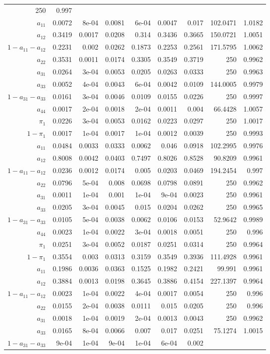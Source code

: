 \documentclass[]{article}
\begin{document}
\begin{longtable}[]{@{}rrrrrrrrr@{}}
250 & 0.997\tabularnewline
\(a_{11}\) & 0.0072 & 8e-04 & 0.0081 & 6e-04 & 0.0047 & 0.017 & 102.0471
& 1.0182\tabularnewline
\(a_{12}\) & 0.3419 & 0.0017 & 0.0208 & 0.314 & 0.3436 & 0.3665 &
150.0721 & 1.0051\tabularnewline
\(1 - a_{11} - a_{12}\) & 0.2231 & 0.002 & 0.0262 & 0.1873 & 0.2253 &
0.2561 & 171.5795 & 1.0062\tabularnewline
\(a_{22}\) & 0.3531 & 0.0011 & 0.0174 & 0.3305 & 0.3549 & 0.3719 & 250 &
0.9962\tabularnewline
\(a_{31}\) & 0.0264 & 3e-04 & 0.0053 & 0.0205 & 0.0263 & 0.0333 & 250 &
0.9963\tabularnewline
\(a_{33}\) & 0.0052 & 4e-04 & 0.0043 & 6e-04 & 0.0042 & 0.0109 &
144.0005 & 0.9979\tabularnewline
\(1 - a_{31} - a_{33}\) & 0.0161 & 3e-04 & 0.0046 & 0.0109 & 0.0155 &
0.0226 & 250 & 0.9997\tabularnewline
\(a_{44}\) & 0.0017 & 2e-04 & 0.0018 & 2e-04 & 0.0011 & 0.004 & 66.4428
& 1.0057\tabularnewline
\(\pi_{1}\) & 0.0226 & 3e-04 & 0.0053 & 0.0162 & 0.0223 & 0.0297 & 250 &
1.0017\tabularnewline
\(1 - \pi_{1}\) & 0.0017 & 1e-04 & 0.0017 & 1e-04 & 0.0012 & 0.0039 &
250 & 0.9993\tabularnewline
\(a_{11}\) & 0.0484 & 0.0033 & 0.0333 & 0.0062 & 0.046 & 0.0918 &
102.2995 & 0.9976\tabularnewline
\(a_{12}\) & 0.8008 & 0.0042 & 0.0403 & 0.7497 & 0.8026 & 0.8528 &
90.8209 & 0.9961\tabularnewline
\(1 - a_{11} - a_{12}\) & 0.0236 & 0.0012 & 0.0174 & 0.005 & 0.0203 &
0.0469 & 194.2454 & 0.997\tabularnewline
\(a_{22}\) & 0.0796 & 5e-04 & 0.008 & 0.0698 & 0.0798 & 0.0891 & 250 &
0.9962\tabularnewline
\(a_{31}\) & 0.0011 & 1e-04 & 0.001 & 1e-04 & 9e-04 & 0.0023 & 250 &
0.9961\tabularnewline
\(a_{33}\) & 0.0205 & 3e-04 & 0.0045 & 0.015 & 0.0204 & 0.0262 & 250 &
0.9965\tabularnewline
\(1 - a_{31} - a_{33}\) & 0.0105 & 5e-04 & 0.0038 & 0.0062 & 0.0106 &
0.0153 & 52.9642 & 0.9989\tabularnewline
\(a_{44}\) & 0.0023 & 1e-04 & 0.0022 & 3e-04 & 0.0018 & 0.0051 & 250 &
0.996\tabularnewline
\(\pi_{1}\) & 0.0251 & 3e-04 & 0.0052 & 0.0187 & 0.0251 & 0.0314 & 250 &
0.9964\tabularnewline
\(1 - \pi_{1}\) & 0.3554 & 0.003 & 0.0313 & 0.3159 & 0.3549 & 0.3936 &
111.4928 & 0.9961\tabularnewline
\(a_{11}\) & 0.1986 & 0.0036 & 0.0363 & 0.1525 & 0.1982 & 0.2421 &
99.991 & 0.9961\tabularnewline
\(a_{12}\) & 0.3884 & 0.0013 & 0.0198 & 0.3645 & 0.3886 & 0.4154 &
227.1397 & 0.9964\tabularnewline
\(1 - a_{11} - a_{12}\) & 0.0023 & 1e-04 & 0.0022 & 4e-04 & 0.0017 &
0.0054 & 250 & 0.996\tabularnewline
\(a_{22}\) & 0.0155 & 2e-04 & 0.0038 & 0.0111 & 0.015 & 0.0205 & 250 &
0.996\tabularnewline
\(a_{31}\) & 0.0018 & 1e-04 & 0.0019 & 2e-04 & 0.0013 & 0.0043 & 250 &
0.9962\tabularnewline
\(a_{33}\) & 0.0165 & 8e-04 & 0.0066 & 0.007 & 0.017 & 0.0251 & 75.1274
& 1.0015\tabularnewline
\(1 - a_{31} - a_{33}\) & 9e-04 & 1e-04 & 9e-04 & 1e-04 & 6e-04 & 0.002

\end{longtable}
\end{document}
